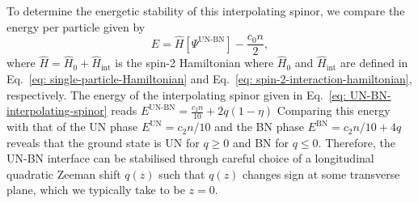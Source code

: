 To determine the energetic stability of this interpolating spinor, we compare
the energy per particle given by~\cite{Kawaguchi2012}
\begin{equation}\label{eq: energy-per-particle}
    E = \hat{H}\left[\Psi^\text{UN-BN}\right] - \frac{c_0n}{2},
\end{equation}
where \(\hat{H} = \hat{H}_0 + \hat{H}_\text{int}\) is the spin-2
Hamiltonian where \(\hat{H}_0\) and \(\hat{H}_\text{int}\)
are defined in Eq.~\eqref{eq: single-particle-Hamiltonian} and
Eq.~\eqref{eq: spin-2-interaction-hamiltonian}, respectively.
The energy of the interpolating spinor given in
Eq.~\eqref{eq: UN-BN-interpolating-spinor} reads
\(E^\text{UN-BN} = \frac{c_2n}{10} + 2q(1 - \eta)\)
Comparing this energy with that of the UN phase
\(E^\text{UN} = c_2n/10\) and the BN phase
\(E^\text{BN} = c_2n/10 + 4q\) reveals that the ground state is UN for
\(q \geq 0\) and BN for \(q \leq 0\).
Therefore, the UN-BN interface can be stabilised through careful choice of
a longitudinal quadratic Zeeman shift \(q(z)\) such that \(q(z)\) changes
sign at some transverse plane, which we typically take to be \(z=0\).


